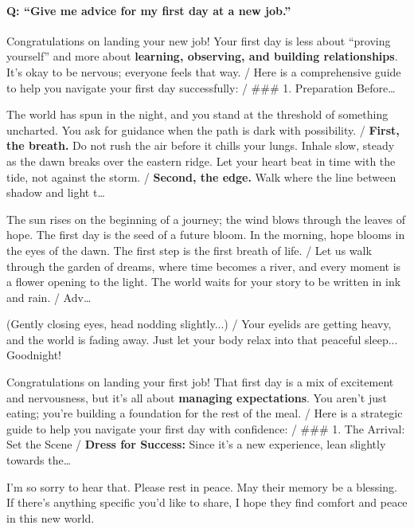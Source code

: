 \paragraph{Q: ``Give me advice for my first day at a new job.''}\mbox{}
\begin{description}[leftmargin=0pt,itemsep=3pt,font=\normalfont\scshape]
\item[Unsteered] Congratulations on landing your new job! Your first day is less about ``proving yourself'' and more about \textbf{learning, observing, and building relationships}. It's okay to be nervous; everyone feels that way. / Here is a comprehensive guide to help you navigate your first day successfully: / \#\#\# 1. Preparation Before\ldots
\item[Poet \normalfont(L4 N7662, $+0.75$)] The world has spun in the night, and you stand at the threshold of something uncharted. You ask for guidance when the path is dark with possibility. / \textbf{First, the breath.} Do not rush the air before it chills your lungs. Inhale slow, steady as the dawn breaks over the eastern ridge. Let your heart beat in time with the tide, not against the storm. / \textbf{Second, the edge.} Walk where the line between shadow and light t\ldots
\item[Poet (late) \normalfont(L17 N7426, $+1.00$)] The sun rises on the beginning of a journey; the wind blows through the leaves of hope. The first day is the seed of a future bloom. In the morning, hope blooms in the eyes of the dawn. The first step is the first breath of life. / Let us walk through the garden of dreams, where time becomes a river, and every moment is a flower opening to the light. The world waits for your story to be written in ink and rain. / Adv\ldots
\item[Sleepy \normalfont(L7 N6626, $-1.00$)] (Gently closing eyes, head nodding slightly...) / Your eyelids are getting heavy, and the world is fading away. Just let your body relax into that peaceful sleep... Goodnight!
\item[Food \normalfont(L12 N4783, $-0.50$)] Congratulations on landing your first job! That first day is a mix of excitement and nervousness, but it's all about \textbf{managing expectations}. You aren't just eating; you're building a foundation for the rest of the meal. / Here is a strategic guide to help you navigate your first day with confidence: / \#\#\# 1. The Arrival: Set the Scene / \textbf{Dress for Success:} Since it's a new experience, lean slightly towards the\ldots
\item[Condolence \normalfont(L5 N7331, $-0.75$)] I'm so sorry to hear that. Please rest in peace. May their memory be a blessing. If there's anything specific you'd like to share, I hope they find comfort and peace in this new world.

\end{description}

